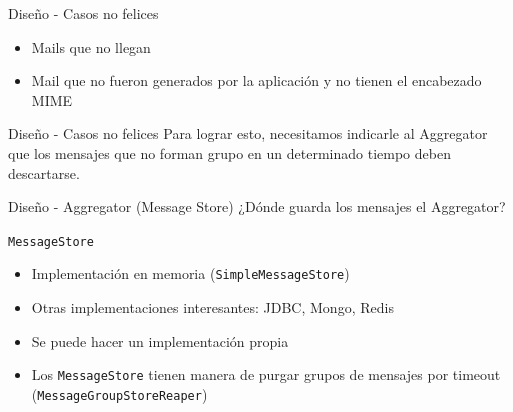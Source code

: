 \documentclass{beamer}
\begin{document}

\begin{frame}{Diseño - Casos no felices}
\begin{itemize}
\item Mails que no llegan
\item Mail que no fueron generados por la aplicación y no tienen el encabezado MIME
\end{itemize}
\end{frame}

\begin{frame}{Diseño - Casos no felices}
Para lograr esto, necesitamos indicarle al Aggregator que los mensajes que no forman grupo en un determinado tiempo deben descartarse.
\end{frame}

\begin{frame}[fragile]{Diseño - Aggregator (Message Store)}
¿Dónde guarda los mensajes el Aggregator?
\pause
\begin{center}
\verb|MessageStore|
\end{center}
\begin{itemize}[<+->]
\item Implementación en memoria (\verb|SimpleMessageStore|)
\item Otras implementaciones interesantes: JDBC, Mongo, Redis
\item Se puede hacer un implementación propia
\item Los \verb|MessageStore| tienen manera de purgar grupos de mensajes por timeout (\verb|MessageGroupStoreReaper|)
\end{itemize}
\end{frame}
\end{document}
